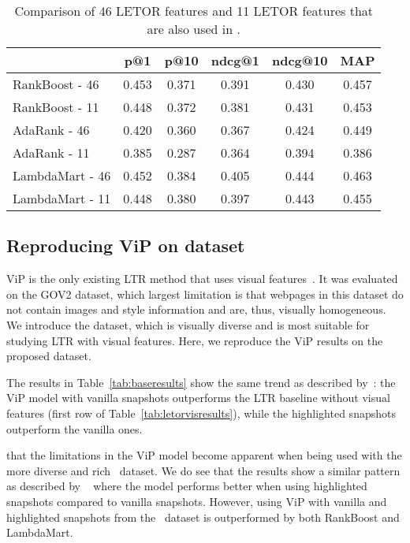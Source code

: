 \begin{table}[h]
\caption{Comparison of 46 LETOR features and 11 LETOR features that are also used in \datasetname.}
\label{tab:11vs46}
\centering
\begin{tabular}{lccccc}
\toprule
           & p@1  & p@10   & ndcg@1 & ndcg@10 & MAP \\ 
\midrule
RankBoost - 46 & 0.453 & 0.371 & 0.391 & 0.430  & 0.457 \\
RankBoost - 11 & 0.448 & 0.372 & 0.381  & 0.431   & 0.453 \\
\midrule
AdaRank - 46  & 0.420 & 0.360 & 0.367 & 0.424  & 0.449 \\
AdaRank - 11  & 0.385 & 0.287 & 0.364  & 0.394   & 0.386 \\ 
\midrule
LambdaMart - 46 & 0.452 & 0.384 & 0.405 & 0.444  & 0.463 \\
LambdaMart - 11 & 0.448 & 0.380 & 0.397  & 0.443   & 0.455 \\
\bottomrule
\end{tabular}
\end{table}



\subsection{Reproducing ViP on \datasetname{} dataset}
ViP is the only existing \ac{LTR} method that uses visual features~\cite{fan2017learning}.
It was evaluated on the GOV2 dataset, which largest limitation is that webpages in this dataset do not contain images and style information and are, thus, visually homogeneous.
We introduce the \datasetname{} dataset, which is visually diverse and is most suitable for studying \ac{LTR} with visual features.
Here, we reproduce the ViP results on the proposed \datasetname{} dataset.

The results in Table~\ref{tab:baseresults} show the same trend as described by~\citet{fan2017learning}:
the ViP model with vanilla snapshots outperforms the \ac{LTR} baseline without visual features (first row of Table~\ref{tab:letorvisresults}),
while the highlighted snapshots outperform the vanilla ones.

that the limitations in the ViP model become apparent when being used with the more diverse and rich \datasetname~dataset. We do see that the results show a similar pattern as described by ~\citet{fan2017learning} where the model performs better when using highlighted snapshots compared to vanilla snapshots. However, using ViP with vanilla and highlighted snapshots from the \datasetname~dataset is outperformed by both RankBoost and LambdaMart. 
\fi





